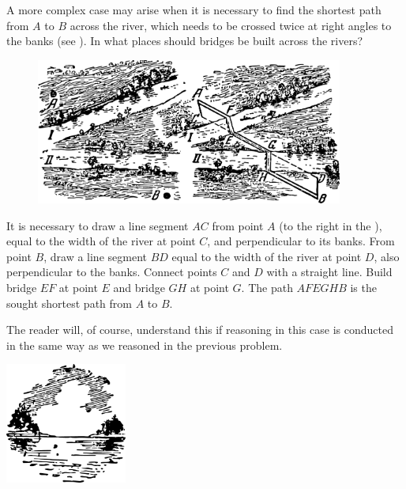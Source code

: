 \ques A more complex case may arise when it is necessary to find the shortest path from $A$ to $B$ across the river, which needs to be crossed twice at right angles to the banks (see ). In what places should bridges be built across the rivers?

\begin{figure}[h!]
\centering
\includegraphics[width=0.9\textwidth]{figures/ch-02/fig-060.pdf}
\end{figure}

\ans It is necessary to draw a line segment $AC$ from point $A$ (to the right in the ), equal to the width of the river at point $C$, and perpendicular to its banks. From point $B$, draw a line segment $BD$ equal to the width of the river at point $D$, also perpendicular to the banks. Connect points $C$ and $D$ with a straight line. Build bridge $EF$ at point $E$ and bridge $GH$ at point $G$. The path $AFEGHB$ is the sought shortest path from $A$ to $B$.


The reader will, of course, understand this if reasoning in this case is conducted in the same way as we reasoned in the previous problem.




\begin{center}
\includegraphics[width=0.3\textwidth]{figures/ch-02/fig-ch-02-tail.pdf}
\end{center}


















